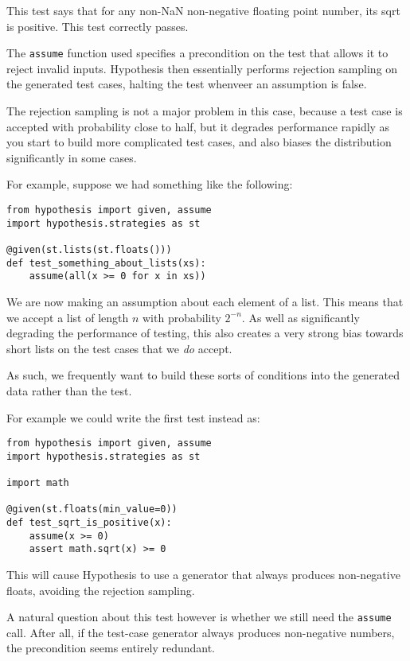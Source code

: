 This test says that for any non-NaN non-negative floating point number,
its sqrt is positive.
This test correctly passes.

The \texttt{assume} function used specifies a precondition on the test that allows it to reject invalid inputs.
Hypothesis then essentially performs rejection sampling on the generated test cases,
halting the test whenveer an assumption is false.

The rejection sampling is not a major problem in this case,
because a test case is accepted with probability close to half,
but it degrades performance rapidly as you start to build more complicated test cases,
and also biases the distribution significantly in some cases.

For example,
suppose we had something like the following:

\begin{lstlisting}
from hypothesis import given, assume
import hypothesis.strategies as st

@given(st.lists(st.floats()))
def test_something_about_lists(xs):
    assume(all(x >= 0 for x in xs))
\end{lstlisting}

We are now making an assumption about each element of a list.
This means that we accept a list of length \(n\) with probability \(2^{-n}\).
As well as significantly degrading the performance of testing,
this also creates a very strong bias towards short lists on the test cases that we \emph{do} accept.

As such,
we frequently want to build these sorts of conditions into the generated data rather than the test.

For example we could write the first test instead as:

\begin{lstlisting}
from hypothesis import given, assume
import hypothesis.strategies as st

import math

@given(st.floats(min_value=0))
def test_sqrt_is_positive(x):
    assume(x >= 0)
    assert math.sqrt(x) >= 0
\end{lstlisting}

This will cause Hypothesis to use a generator that always produces non-negative floats,
avoiding the rejection sampling.

A natural question about this test however is whether we still need the \texttt{assume} call.
After all,
if the test-case generator always produces non-negative numbers,
the precondition seems entirely redundant.

